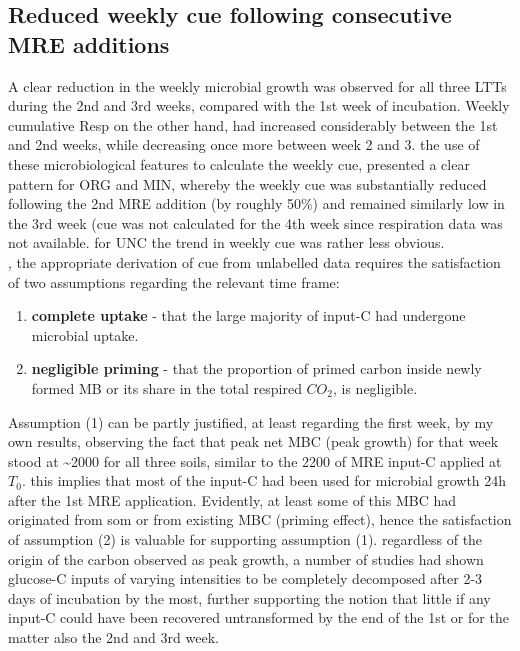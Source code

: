 \documentclass[12pt]{report}
\begin{document}
		\subsection{Reduced weekly \gls{cue} following consecutive MRE additions}
		
		A clear reduction in the weekly microbial growth was observed for all three LTTs during the 2nd and 3rd weeks, compared with the 1st week of incubation.
		Weekly cumulative Resp on the other hand, had increased considerably between the 1st and 2nd weeks, while decreasing once more between week 2 and 3.
		the use of these microbiological features to calculate the weekly \gls{cue}, presented a clear pattern for ORG and MIN, whereby the weekly \gls{cue} was substantially reduced following the 2nd MRE addition (by roughly 50\%) and remained similarly low in the 3rd week (\gls{cue} was not calculated for the 4th week since respiration data was not available. for UNC the trend in weekly \gls{cue} was rather less obvious.\\
		, the appropriate derivation of \gls{cue} from unlabelled data requires the satisfaction of two assumptions regarding the relevant time frame:
		\begin{enumerate}
			\item \label{item: complete_uptake}\textbf{complete uptake} - that the large majority of input-C had undergone microbial uptake.
			\item \label{item: negligible_priming}\textbf{negligible priming} - that the proportion of primed carbon inside newly formed MB or its share in the total respired $ CO_2 $, is negligible.
		\end{enumerate}
		Assumption (1) can be partly justified, at least regarding the first week, by  my own results,  observing the fact that peak net MBC (peak growth) for that week stood at \~{}2000 \genericunit for all three soils, similar to the 2200 \genericunit of MRE input-C applied at $ T_0 $. this implies that most of the  input-C had been used for microbial growth 24h after the 1st MRE application. Evidently, at least some of this MBC had originated from \gls{som} or from existing MBC (priming effect), hence the satisfaction of assumption (2) is valuable for supporting assumption (1). regardless of the origin of the carbon observed as peak growth, a  number of studies had shown glucose-C inputs of varying intensities to be completely decomposed after 2-3 days of incubation by the most\citep{hill2008, landi2006}, further supporting the notion that little if any input-C could have been recovered untransformed by the end of the 1st or for the matter also the 2nd and 3rd week.
\end{document}
